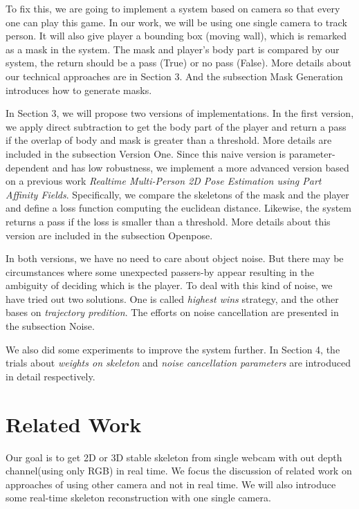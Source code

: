 \documentclass[11pt,twocolumn,letterpaper]{article}
\begin{document}
    \par To fix this, we are going to implement a system based on camera so that every one can play this game.
        In our work, we will be using one single camera to track person. It will also give player a bounding box (moving wall), which is remarked as a mask in the system.
        The mask and player's body part is compared by our system, the return should be a pass (True) or no pass (False). More details about our technical approaches are in Section 3. And the subsection Mask Generation introduces how to generate masks.
    \par In Section 3, we will propose two versions of implementations. In the first version, we apply direct subtraction to get the body part of the player and return a pass if the overlap of body and mask is greater than a threshold. More details are included in the subsection Version One. Since this naive version is parameter-dependent and has low robustness, we implement a more advanced version based on a previous work \textit{Realtime Multi-Person 2D Pose Estimation using Part Affinity Fields}\cite{cao2017realtime}. Specifically, we compare the skeletons of the mask and the player and define a loss function computing the euclidean distance. Likewise, the system returns a pass if the loss is smaller than a threshold. More details about this version are included in the subsection Openpose.
    \par In both versions, we have no need to care about object noise. But there may be circumstances where some unexpected passers-by appear resulting in the ambiguity of deciding which is the player. To deal with this kind of noise, we have tried out two solutions. One is called \emph{highest wins} strategy, and the other bases on \emph{trajectory predition}. The efforts on noise cancellation are presented in the subsection Noise.
    \par We also did some experiments to improve the system further. In Section 4, the trials about \emph{weights on skeleton} and \emph{noise cancellation parameters} are introduced in detail respectively.
\section{Related Work}
Our goal is to get 2D or 3D stable skeleton from single webcam with out depth channel(using only RGB) in real time. We focus the discussion of related work on approaches of using other camera and not in real time. We will also introduce some real-time skeleton reconstruction with one single camera.
\end{document}
